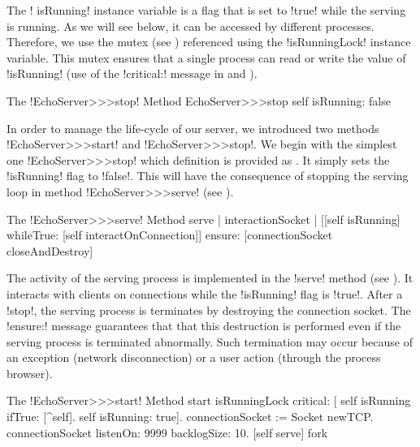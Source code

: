 \documentclass[a4paper,10pt,twoside]{book}
\begin{document}
The \ct! isRunning! instance variable is a flag that is set to \ct!true! while the serving is running.
As we will see below, it can be accessed by different processes.
Therefore, we use the mutex (see ) referenced using the \ct!isRunningLock! instance variable. 
This mutex ensures that a single process can read or write the value of \ct!isRunning! (use of the \ct!critical:! message in  and ).

\begin{method}{The \ct!EchoServer>>>stop! Method}
EchoServer>>>stop
	self isRunning: false
\end{method}

In order to manage the life-cycle of our server, we introduced two methods \ct!EchoServer>>>start! and \ct!EchoServer>>>stop!.
We begin with the simplest one \ct!EchoServer>>>stop! which definition is provided as .
It simply sets the \ct!isRunning! flag to \ct!false!.
This will have the consequence of stopping the serving loop in method \ct!EchoServer>>>serve! (see ). 

\begin{method}{The \ct!EchoServer>>>serve! Method}
serve
| interactionSocket |
[[self isRunning]
	whileTrue: [self interactOnConnection]]
	ensure: [connectionSocket closeAndDestroy]
\end{method}

The activity of the serving process is implemented in the \ct!serve! method (see ).
It interacts with clients on connections while the \ct!isRunning! flag is \ct!true!.
After a \ct!stop!, the serving process is terminates by destroying the connection socket.
The \ct!ensure:! message guarantees that that this destruction is performed even if the serving process is terminated abnormally. 
Such termination may occur because of an exception (\eg network disconnection) or a user action (\eg through the process browser).   

\begin{method}{The \ct!EchoServer>>>start! Method}
start
	isRunningLock critical: [
		self isRunning ifTrue: [^self].
		self isRunning: true].
	connectionSocket := Socket newTCP.
	connectionSocket listenOn: 9999 backlogSize: 10.
	[self serve] fork
\end{method}
\end{document}
